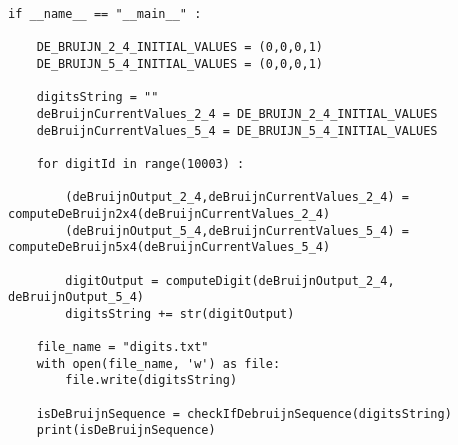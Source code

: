 \documentclass{article}
\begin{document}
\begin{verbatim}
if __name__ == "__main__" :
    
    DE_BRUIJN_2_4_INITIAL_VALUES = (0,0,0,1)
    DE_BRUIJN_5_4_INITIAL_VALUES = (0,0,0,1)

    digitsString = ""
    deBruijnCurrentValues_2_4 = DE_BRUIJN_2_4_INITIAL_VALUES
    deBruijnCurrentValues_5_4 = DE_BRUIJN_5_4_INITIAL_VALUES

    for digitId in range(10003) :

        (deBruijnOutput_2_4,deBruijnCurrentValues_2_4) = computeDeBruijn2x4(deBruijnCurrentValues_2_4)
        (deBruijnOutput_5_4,deBruijnCurrentValues_5_4) = computeDeBruijn5x4(deBruijnCurrentValues_5_4)

        digitOutput = computeDigit(deBruijnOutput_2_4, deBruijnOutput_5_4)
        digitsString += str(digitOutput)

    file_name = "digits.txt"
    with open(file_name, 'w') as file:
        file.write(digitsString)

    isDeBruijnSequence = checkIfDebruijnSequence(digitsString)
    print(isDeBruijnSequence)
\end{verbatim}
\end{document}
